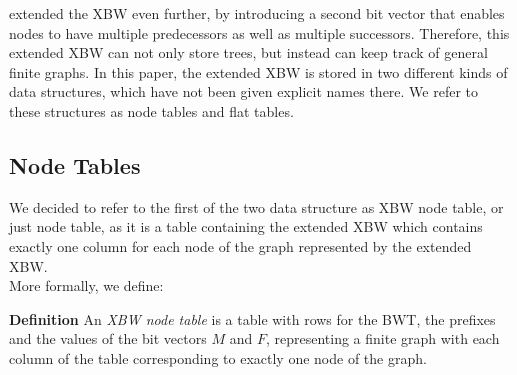 \documentclass[a4paper,12pt,twoside,BCOR=10mm]{scrbook}
\begin{document}
\citet{Siren2014} extended the XBW even further, by introducing a second bit vector that enables nodes 
to have multiple predecessors as well as multiple successors. Therefore, this extended XBW can not only 
store trees, but instead can keep track of general finite graphs. 
In this paper, the extended XBW is stored in two different kinds of data structures, 
which have not been given explicit names there. We refer to these structures as 
node tables and flat tables.

\subsection{Node Tables}
\label{sec:node_table_definition}

We decided to refer to the first of the two data structure as XBW node table, or just node table, 
as it is a 
table containing the extended XBW which contains exactly one column for each 
node of the graph represented by the extended XBW. \\
More formally, we define:

\textbf{Definition} An \textit{XBW node table} is a table with rows for the BWT, 
the prefixes and the values of the bit vectors $ M $ and $ F $, 
representing a finite graph with each column of the table corresponding 
to exactly one node of the graph.
\end{document}
